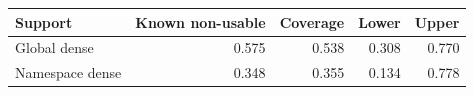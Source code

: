 \begin{tabular}{lrrrr}
\toprule
Support & Known non-usable & Coverage & Lower & Upper \\
\midrule
Global dense & 0.575 & 0.538 & 0.308 & 0.770 \\
Namespace dense & 0.348 & 0.355 & 0.134 & 0.778 \\
\bottomrule
\end{tabular}
